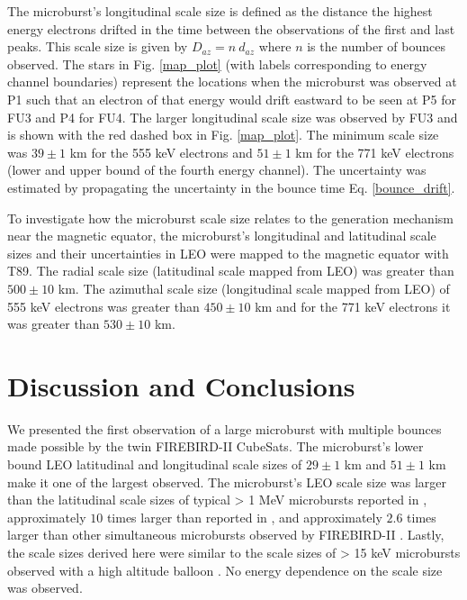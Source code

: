 \documentclass[draft, linenumbers]{agujournal}
\begin{document}
The microburst's longitudinal scale size is defined as the distance the highest energy electrons drifted in the time between the observations of the first and last peaks. This scale size is given by $D_{az} = n \ d_{az}$ where $n$ is the number of bounces observed. The stars in Fig. \ref{map_plot} (with labels corresponding to energy channel boundaries) represent the locations when the microburst was observed at P1 such that an electron of that energy would drift eastward to be seen at P5 for FU3 and P4 for FU4. The larger longitudinal scale size was observed by FU3 and is shown with the red dashed box in Fig. \ref{map_plot}. The minimum scale size was $ 39 \pm 1$ km for the 555 keV electrons and $ 51 \pm 1$ km for the 771 keV electrons (lower and upper bound of the fourth energy channel). The uncertainty was estimated by propagating the uncertainty in the bounce time Eq. \ref{bounce_drift}.

To investigate how the microburst scale size relates to the generation mechanism near the magnetic equator, the microburst's longitudinal and latitudinal scale sizes and their uncertainties in LEO were mapped to the magnetic equator with T89. The radial scale size (latitudinal scale mapped from LEO) was greater than $500 \pm​ 10$ km. The azimuthal scale size (longitudinal scale mapped from LEO) of 555 keV electrons was greater than $450 \pm 10$ km and for the 771 keV electrons it was greater than $530 \pm 10$ km.

\section{Discussion and Conclusions} \label{discussion}
We presented the first observation of a large microburst with multiple bounces made possible by the twin FIREBIRD-II CubeSats. The microburst's lower bound LEO latitudinal and longitudinal scale sizes of $29 \pm 1$ km and $ 51 \pm 1$ km make it one of the largest observed. The microburst's LEO scale size was larger than the latitudinal scale sizes of typical > 1 MeV microbursts reported in \citet{Blake1996}, approximately $10$ times larger than reported in \citet{Dietrich2010}, and approximately $2.6$ times larger than other simultaneous microbursts observed by FIREBIRD-II \citep{Crew2016}. Lastly, the scale sizes derived here were similar to the scale sizes of > 15 keV microbursts observed with a high altitude balloon \citep{Parks1967}. No energy dependence on the scale size was observed.
\end{document}
